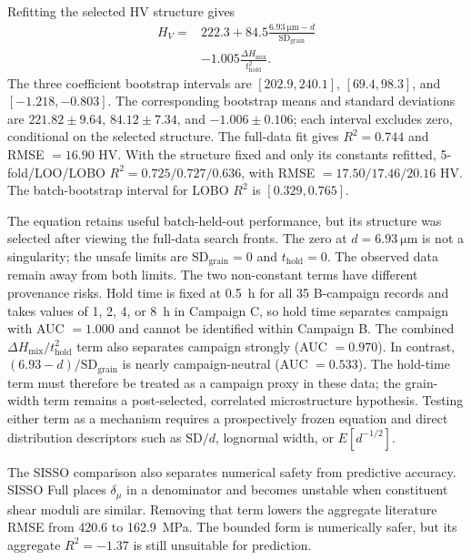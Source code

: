 \documentclass[5p,times,twocolumn]{elsarticle}
\begin{document}
Refitting the selected HV structure gives
\begin{equation}
\begin{split}
H_V={}&222.3+84.5\frac{\SI{6.93}{\micro\meter}-d}
                         {\mathrm{SD}_{\mathrm{grain}}}\\
     &-1.005\frac{\Delta H_{\mathrm{mix}}}{t_{\mathrm{hold}}^2}.
\end{split}
\label{eq:hvcorr}
\end{equation}
The three coefficient bootstrap intervals are $[202.9,240.1]$, $[69.4,98.3]$, and $[-1.218,-0.803]$. The corresponding bootstrap means and standard deviations are $221.82\pm9.64$, $84.12\pm7.34$, and $-1.006\pm0.106$; each interval excludes zero, conditional on the selected structure. The full-data fit gives $R^2=0.744$ and RMSE $=16.90$ HV. With the structure fixed and only its constants refitted, 5-fold/LOO/LOBO $R^2=0.725/0.727/0.636$, with RMSE $=17.50/17.46/20.16$ HV. The batch-bootstrap interval for LOBO $R^2$ is $[0.329,0.765]$.

The equation retains useful batch-held-out performance, but its structure was selected after viewing the full-data search fronts. The zero at $d=\SI{6.93}{\micro\meter}$ is not a singularity; the unsafe limits are $\mathrm{SD}_{\mathrm{grain}}=0$ and $t_{\mathrm{hold}}=0$. The observed data remain away from both limits. The two non-constant terms have different provenance risks. Hold time is fixed at 0.5~h for all 35 B-campaign records and takes values of 1, 2, 4, or 8~h in Campaign C, so hold time separates campaign with AUC $=1.000$ and cannot be identified within Campaign B. The combined $\Delta H_{\mathrm{mix}}/t_{\mathrm{hold}}^2$ term also separates campaign strongly (AUC $=0.970$). In contrast, $(6.93-d)/\mathrm{SD}_{\mathrm{grain}}$ is nearly campaign-neutral (AUC $=0.533$). The hold-time term must therefore be treated as a campaign proxy in these data; the grain-width term remains a post-selected, correlated microstructure hypothesis. Testing either term as a mechanism requires a prospectively frozen equation and direct distribution descriptors such as $\mathrm{SD}/d$, lognormal width, or $E[d^{-1/2}]$.

The SISSO comparison also separates numerical safety from predictive accuracy. SISSO Full places $\delta_\mu$ in a denominator and becomes unstable when constituent shear moduli are similar. Removing that term lowers the aggregate literature RMSE from 420.6 to \SI{162.9}{MPa}. The bounded form is numerically safer, but its aggregate $R^2=-1.37$ is still unsuitable for prediction.
\end{document}

